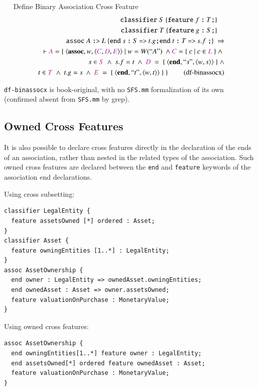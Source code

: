 \begin{definition}~~   Define Binary Association Cross Feature
\begin{align}
\texttt{classifier} ~S~ \{ \texttt{feature} ~f ~\texttt{:}~ T\texttt{;} \}~~~~ \notag \\
\texttt{classifier} ~T~ \{ \texttt{feature} ~g ~\texttt{:}~ S\texttt{;} \}~~~~ \notag \\
\texttt{assoc}~ A~\texttt{:>}~L~\{ \texttt{end}~ s ~\texttt{:}~ S~\texttt{=>}~t.g\texttt{;} \texttt{end}~ t ~\texttt{:}~ T~\texttt{=>}~s.f~\texttt{;} \}~\Rightarrow  \notag \\
\vdash  \mc{A} = \{~\langle \textbf{assoc},w,\langle  \mc{C},\mc{D},\mc{E}\rangle\rangle ~\vert~
w=W(``A")~ \wedge 
\mc{C}=\{~c~\vert ~c \in \mc{L}~\}~\wedge~\notag \\
~s\in \mc{S}~\wedge~s.f=t~\wedge~\mc{D}~=~\{~\langle\textbf{end},``s",\langle w,s \rangle\rangle~\}~\wedge \notag \\
~t\in \mc{T}~\wedge~t.g=s~\wedge~\mc{E}~=~\{~\langle\textbf{end},``t",\langle w,t \rangle\rangle~\}~\}~\label{eq:df-binassocx}\tag{df-binassocx}
\end{align}
\end{definition}

\pn \texttt{df-binassocx} is book-original, with no \texttt{SFS.mm} formalization of its own (confirmed absent
from \texttt{SFS.mm} by grep).

\subsection{Owned Cross Features}

\pn It is also possible to declare cross features directly in the declaration of the ends of an association, rather than nested
in the related types of the association. 
Such owned cross features are declared between the \texttt{end} and \texttt{feature}
keywords of the association end declarations.

\pn Using cross subsetting:
\begin{lstlisting}
classifier LegalEntity {
  feature assetsOwned [*] ordered : Asset;
}
classifier Asset {
  feature owningEntities [1..*] : LegalEntity;
}
assoc AssetOwnership {
  end owner : LegalEntity => ownedAsset.owningEntities;
  end ownedAsset : Asset => owner.assetsOwned;
  feature valuationOnPurchase : MonetaryValue;
}
\end{lstlisting}

\pn Using owned cross features:
\begin{lstlisting}
assoc AssetOwnership {
  end owningEntities[1..*] feature owner : LegalEntity;
  end assetsOwned[*] ordered feature ownedAsset : Asset;
  feature valuationOnPurchase : MonetaryValue;
}
\end{lstlisting}

